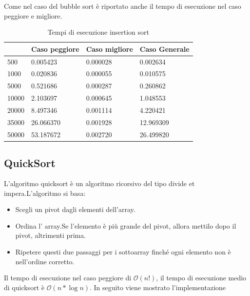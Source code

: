 \documentclass[12pt,a4paper]{report}
\begin{document}
	

Come nel caso del bubble sort è riportato anche il tempo di esecuzione nel caso peggiore e migliore.

\begin{table}[ht]
\centering
\begin{tabular}{| l | l | l | l |}
\hline
           & Caso peggiore & Caso migliore & Caso Generale \\ \hline
500   & 0.005423      & 0.000028      & 0.002634      \\ \hline
1000  & 0.020836	    & 0.000055      & 0.010575      \\ \hline
5000  & 0.521686      & 0.000287     & 0.260862     \\ \hline
10000 & 2.103697      & 0.000645     & 1.048553      \\ \hline
20000 & 8.497346     & 0.001114      & 4.220421     \\ \hline
35000 & 26.066370     & 0.001928     & 12.969309     \\ \hline
50000 & 53.187672     & 0.002720   & 26.499820    \\ \hline

\end{tabular}
\caption{Tempi di esecuzione insertion sort}
\label{Tab:Tempi esecuzione InsertionSort}
\end{table}


\subsection{QuickSort}
L'algoritmo quicksort è un algoritmo ricorsivo del tipo divide et impera.L'algoritmo si basa:
\begin{itemize}
\item Scegli un pivot dagli elementi dell'array.
\item Ordina l' array.Se l'elemento è più grande del pivot, allora mettilo  dopo il pivot, altrimenti prima.
\item Ripetere questi due passaggi per i sottoarray finché ogni elemento non è nell'ordine corretto.
\end{itemize}

Il tempo di esecuzione nel caso peggiore di $\mathcal{O}(n!) $, il tempo di esecuzione medio di quicksort è $\mathcal{O}(n * \log{}n) $. In seguito viene mostrato l'implementazione 
\end{document}
